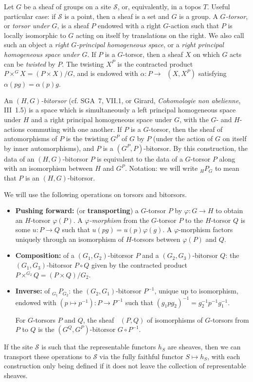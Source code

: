 \documentclass{article}
\theoremstyle{definition}
\newenvironment{env}[1]
  {\renewcommand\theinnerenv{(#1)}\innerenv}
  {\endinnerenv}
\renewcommand{\cal}[1]{{\mathcal{#1}}}
\DeclareMathOperator{\shIsom}{\underline{Isom}}
\newcommand{\oldpage}[1]{\marginpar{\footnotesize$\Big\vert$ \textit{p.~#1}}}
\begin{document}
\begin{env}{0.5}
\label{0.5}
  Let $G$ be a sheaf of groups on a site $\cal{S}$, or, equivalently, in a topos $T$.
  Useful particular case: if $\cal{S}$ is a point, then a sheaf is a set and $G$ is a group.
  A \emph{$G$-torsor}, or \emph{torsor under $G$}, is a sheaf $P$ endowed with a right $G$-action such that $P$ is locally isomorphic to $G$ acting on itself by translations on the right.
  We also call such an object a \emph{right $G$-principal homogeneous space}, or a \emph{right principal homogeneous space under $G$}.
\oldpage{10~(88)}
  If $P$ is a $G$-torsor, then a sheaf $X$ on which $G$ acts can be \emph{twisted} by $P$.
  The twisting $X^P$ is the contracted product $P\times^G X=(P\times X)/G$, and is endowed with $\alpha\colon P\to\shIsom(X,X^P)$ satisfying $\alpha(pg)=\alpha(p)g$.

  An \emph{$(H,G)$-bitorsor} (cf. SGA~7, VII.1, or Girard, \emph{Cohomologie non abelienne}, III~1.5) is a space which is simultaneously a left principal homogeneous space under $H$ and a right principal homogeneous space under $G$, with the $G$- and $H$-actions commuting with one another.
  If $P$ is a $G$-torsor, then the sheaf of automorphisms of $P$ is the twisting $G^P$ of $G$ by $P$ (under the action of $G$ on itself by inner automorphisms), and $P$ is a $(G^P,P)$-bitorsor.
  By this construction, the data of an $(H,G)$-bitorsor $P$ is equivalent to the data of a $G$-torsor $P$ along with an isomorphism between $H$ and $G^P$.
  Notation: we will write ${}_HP_G$ to mean that $P$ is an $(H,G)$-bitorsor.

  We will use the following operations on torsors and bitorsors.
  \begin{itemize}
    \item \textbf{Pushing forward:} (or \textbf{transporting}) a $G$-torsor $P$ by $\varphi\colon G\to H$ to obtain an $H$-torsor $\varphi(P)$.
      A \emph{$\varphi$-morphism} from the $G$-torsor $P$ to the $H$-torsor $Q$ is some $u\colon P\to Q$ such that $u(pg)=u(p)\varphi(g)$.
      A $\varphi$-morphism factors uniquely through an isomorphism of $H$-torsors between $\varphi(P)$ and $Q$.
    \item \textbf{Composition:} of a $(G_1,G_2)$-bitorsor $P$ and a $(G_2,G_3)$-bitorsor $Q$:
      the $(G_1,G_3)$-bitorsor $P\circ Q$ given by the contracted product $P\times^{G_2}Q=(P\times Q)/G_2$.
    \item \textbf{Inverse:} of ${}_{G_1}P_{G_2}$:
      the $(G_2,G_1)$-bitorsor $P^{-1}$, unique up to isomorphism, endowed with $(p\mapsto p^{-1})\colon P\to P^{-1}$ such that $(g_1pg_2)^{-1}=g_2^{-1}p^{-1}g_1^{-1}$.

      For $G$-torsors $P$ and $Q$, the sheaf $\shIsom(P,Q)$ of isomorphisms of $G$-torsors from $P$ to $Q$ is the $(G^Q,G^P)$-bitorsor $G\circ P^{-1}$.
  \end{itemize}

  If the site $\cal{S}$ is such that the representable functors $h_S$ are sheaves, then we can transport these operations to $\cal{S}$ via the fully faithful functor $S\mapsto h_S$, with each construction only being defined if it does not leave the collection of representable sheaves.
\end{env}
\end{document}
